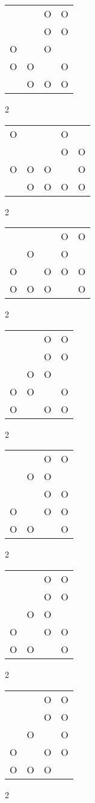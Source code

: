 \begin{tabular}{|m{0.2cm}m{0.2cm}m{0.2cm}m{0.2cm}|}\hline
 & &O&O\\
 & &O&O\\
O& &O& \\
O&O& &O\\
 &O&O&O\\
\hline\end{tabular}2
\begin{tabular}{|m{0.2cm}m{0.2cm}m{0.2cm}m{0.2cm}m{0.2cm}|}\hline
O& & &O& \\
 & & &O&O\\
O&O&O& &O\\
 &O&O&O&O\\
\hline\end{tabular}2
\begin{tabular}{|m{0.2cm}m{0.2cm}m{0.2cm}m{0.2cm}m{0.2cm}|}\hline
 & & &O&O\\
 &O& &O& \\
O& &O&O&O\\
O&O&O& &O\\
\hline\end{tabular}2
\begin{tabular}{|m{0.2cm}m{0.2cm}m{0.2cm}m{0.2cm}|}\hline
 & &O&O\\
 & &O&O\\
 &O&O& \\
O&O& &O\\
O& &O&O\\
\hline\end{tabular}2
\begin{tabular}{|m{0.2cm}m{0.2cm}m{0.2cm}m{0.2cm}|}\hline
 & &O&O\\
 &O&O& \\
 & &O&O\\
O& &O&O\\
O&O& &O\\
\hline\end{tabular}2
\begin{tabular}{|m{0.2cm}m{0.2cm}m{0.2cm}m{0.2cm}|}\hline
 & &O&O\\
 & &O&O\\
 &O&O& \\
O& &O&O\\
O&O& &O\\
\hline\end{tabular}2
\begin{tabular}{|m{0.2cm}m{0.2cm}m{0.2cm}m{0.2cm}|}\hline
 & &O&O\\
 & &O&O\\
 &O& &O\\
O& &O&O\\
O&O&O& \\
\hline\end{tabular}2
